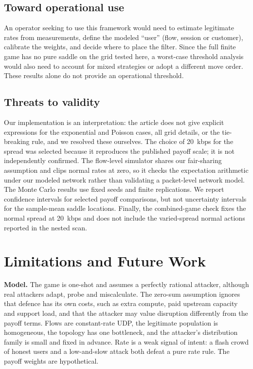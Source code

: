 \documentclass[conference]{IEEEtran}
\begin{document}
\subsection{Toward operational use}
An operator seeking to use this framework would need to estimate legitimate rates from measurements, define the modeled ``user'' (flow, session or customer), calibrate the weights, and decide where to place the filter. Since the full finite game has no pure saddle on the grid tested here, a worst-case threshold analysis would also need to account for mixed strategies or adopt a different move order. These results alone do not provide an operational threshold.

\subsection{Threats to validity}
Our implementation is an interpretation: the article does not give explicit expressions for the exponential and Poisson cases, all grid details, or the tie-breaking rule, and we resolved these ourselves. The choice of 20~kbps for the spread was selected because it reproduces the published payoff scale; it is not independently confirmed. The flow-level simulator shares our fair-sharing assumption and clips normal rates at zero, so it checks the expectation arithmetic under our modeled network rather than validating a packet-level network model. The Monte Carlo results use fixed seeds and finite replications. We report confidence intervals for selected payoff comparisons, but not uncertainty intervals for the sample-mean saddle locations. Finally, the combined-game check fixes the normal spread at 20~kbps and does not include the varied-spread normal actions reported in the nested scan.

\section{Limitations and Future Work}\label{sec:limits}
\textbf{Model.} The game is one-shot and assumes a perfectly rational attacker, although real attackers adapt, probe and miscalculate. The zero-sum assumption ignores that defence has its own costs, such as extra compute, paid upstream capacity and support load, and that the attacker may value disruption differently from the payoff terms. Flows are constant-rate UDP, the legitimate population is homogeneous, the topology has one bottleneck, and the attacker's distribution family is small and fixed in advance. Rate is a weak signal of intent: a flash crowd of honest users and a low-and-slow attack both defeat a pure rate rule. The payoff weights are hypothetical.
\end{document}
